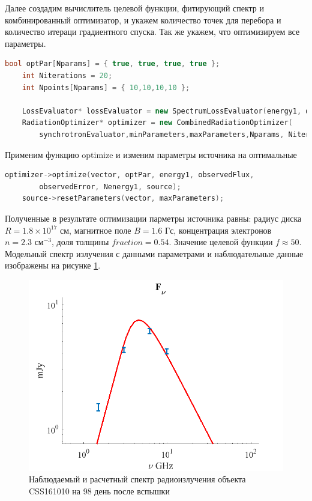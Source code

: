 Далее создадим вычислитель целевой функции, фитирующий спектр и комбинированный оптимизатор, и укажем количество точек для перебора и количество итераци градиентного спуска. Так же укажем, что оптимизируем все параметры.
\begin{lstlisting}[language=c++]
    bool optPar[Nparams] = { true, true, true, true };
    int Niterations = 20;
    int Npoints[Nparams] = { 10,10,10,10 };
    
    LossEvaluator* lossEvaluator = new SpectrumLossEvaluator(energy1, observedFlux, observedError, Nenergy1, source);
    RadiationOptimizer* optimizer = new CombinedRadiationOptimizer(
        synchrotronEvaluator,minParameters,maxParameters,Nparams, Niterations,Npoints, lossEvaluator);
\end{lstlisting}
Применим функцию optimize и изменим параметры источника на оптимальные
\begin{lstlisting}[language=c++]
    optimizer->optimize(vector, optPar, energy1, observedFlux, 
        observedError, Nenergy1, source);
    source->resetParameters(vector, maxParameters);
\end{lstlisting}
Полученные в результате оптимизации парметры источника равны: радиус диска $R = 1.8\times10^17 \text{ см}$, магнитное поле $B = 1.6 \text{ Гс}$, концентрация электронов $n = 2.3 \text{ см}^{-3}$, доля толщины $fraction = 0.54 $. Значение целевой функции $f \approx 50$. Модельный спектр излучения  с данными параметрами и наблюдательные данные изображены на рисунке \ref{synchrotron1}.
\begin{figure}[h]
	\centering
	\includegraphics[width=12.5 cm]{./fig/synchrotron1.png} 
	\caption{Наблюдаемый и расчетный спектр радиоизлучения объекта CSS161010 на 98 день после вспышки}
	\label{synchrotron1}
\end{figure}


